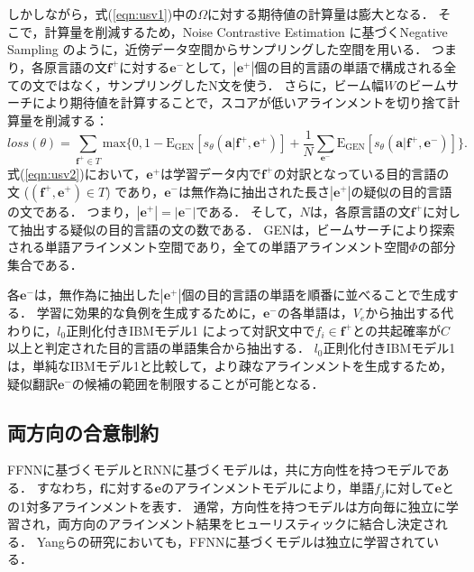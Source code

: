 \documentclass[japanese]{jnlp_1.4}
\begin{document}
しかしながら，式(\ref{eqn:usv1})中の$\Omega$に対する期待値の計算量は膨大となる．
そこで，計算量を削減するため，Noise Contrastive Estimation \cite{gutmann10,mnih12}に基づくNegative Sampling \cite{mikolov13}のように，近傍データ空間からサンプリングした空間を用いる．
つまり，各原言語の文$\boldsymbol{f^{+}}$に対する$\boldsymbol{e^{-}}$として，$|\boldsymbol{e^{+}}|$個の目的言語の単語で構成される全ての文ではなく，サンプリングしたN文を使う．
さらに，ビーム幅$W$のビームサーチにより期待値を計算することで，スコアが低いアラインメントを切り捨て計算量を削減する：
\begin{equation}
\label{eqn:usv2}
\mathit{loss}(\theta)=\sum_{\boldsymbol{f^{+}} \in T}\text{max}\biggr\{0,1-\text{E}_{\text{GEN}}[s_{\theta}(\boldsymbol{a}|\boldsymbol{f^{+}},\boldsymbol{e^{+}})] + \frac{1}{N} \sum_{\boldsymbol{e^{-}}} \text{E}_{\text{GEN}}[s_{\theta}(\boldsymbol{a}|\boldsymbol{f^{+}},\boldsymbol{e^{-}})]\biggl\}.
\end{equation}
式(\ref{eqn:usv2})において，$\boldsymbol{e^{+}}$は学習データ内で$\boldsymbol{f^{+}}$の対訳となっている目的言語の文 ($\boldsymbol{(f^{+},e^{+})} \in T$) であり，$\boldsymbol{e^{-}}$は無作為に抽出された長さ$|\boldsymbol{e^{+}}|$の疑似の目的言語の文である．
つまり，$|\boldsymbol{e^{+}}|=|\boldsymbol{e^{-}}|$である．
そして，$N$は，各原言語の文$\boldsymbol{f^{+}}$に対して抽出する疑似の目的言語の文の数である．
GENは，ビームサーチにより探索される単語アラインメント空間であり，全ての単語アラインメント空間$\Phi$の部分集合である．

各$\boldsymbol{e^{-}}$は，無作為に抽出した$|\boldsymbol{e^{+}}|$個の目的言語の単語を順番に並べることで生成する．
学習に効果的な負例を生成するために，$\boldsymbol{e^{-}}$の各単語は，$V_{e}$から抽出する代わりに，$l_{0}$正則化付きIBMモデル1 \cite{vaswani12}によって対訳文中で$f_{i} \in \boldsymbol{f^{+}}$との共起確率が$C$以上と判定された目的言語の単語集合から抽出する．
$l_{0}$正則化付きIBMモデル1は，単純なIBMモデル1と比較して，より疎なアラインメントを生成するため，疑似翻訳$\boldsymbol{e^{-}}$の候補の範囲を制限することが可能となる．


\subsection{両方向の合意制約}
\label{sect:agreement}

FFNNに基づくモデルとRNNに基づくモデルは，共に方向性を持つモデルである．
すなわち，$\boldsymbol{f}$に対する$\boldsymbol{e}$のアラインメントモデルにより，単語$f_{j}$に対して$\boldsymbol{e}$との1対多アラインメントを表す．
通常，方向性を持つモデルは方向毎に独立に学習され，両方向のアラインメント結果をヒューリスティックに結合し決定される．
Yangらの研究においても，FFNNに基づくモデルは独立に学習されている\cite{yang13}．
\end{document}
